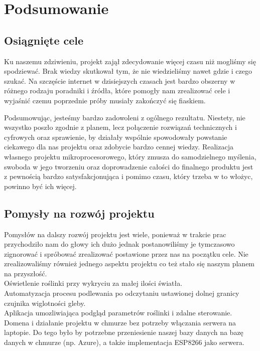 \documentclass[12pt]{article}
\begin{document}
\newpage
\section{Podsumowanie }
\subsection{Osiągnięte cele}
Ku naszemu zdziwieniu, projekt zajął zdecydowanie więcej czasu niż mogliśmy się spodziewać. Brak wiedzy skutkował tym, że nie wiedzieliśmy nawet gdzie i czego szukać. Na szczęście internet w dzisiejszych czasach jest bardzo obszerny w różnego rodzaju poradniki i źródła, które pomogły nam zrealizować cele i wyjaśnić czemu poprzednie próby musiały zakończyć się fiaskiem. 

Podsumowując, jesteśmy bardzo zadowoleni z ogólnego rezultatu. Niestety, nie wszystko poszło zgodnie z planem, lecz połączenie rozwiązań technicznych i cyfrowych oraz sprawienie, by działały wspólnie spowodowały powstanie ciekawego dla nas projektu oraz zdobycie bardzo cennej wiedzy. Realizacja własnego projektu mikroprocesorowego, który zmusza do samodzielnego myślenia, swoboda w jego tworzeniu oraz doprowadzenie całości do finalnego produktu jest z pewnością bardzo satysfakcjonująca i pomimo czasu, który trzeba w to włożyc, powinno być ich więcej.
\subsection{Pomysły na rozwój projektu}
Pomysłów na dalszy rozwój projektu jest wiele, ponieważ w trakcie prac przychodziło nam do głowy ich dużo jednak postanowiliśmy je tymczasowo zignorować i spróbować zrealizować postawione przez nas na początku cele. Nie zrealizowaliśmy również jednego aspektu projektu co też stało się naszym planem na przyszłość. \\

Oświetlenie roślinki przy wykryciu za małej ilości światła.\\
	
Automatyzacja procesu podlewania po odczytaniu ustawionej dolnej granicy czujnika wiglotności gleby.\\

Aplikacja umozliwiająca podgląd parametrów roślinki i zdalne sterowanie.\\
	
Domena i działanie projektu w chmurze bez potrzeby włączania serwera na laptopie. Do tego było by potrzebne przeniesienie naszej bazy danych na bazę danych w chmurze (np. Azure), a także implementacja ESP8266 jako serwera.\\
\end{document}
